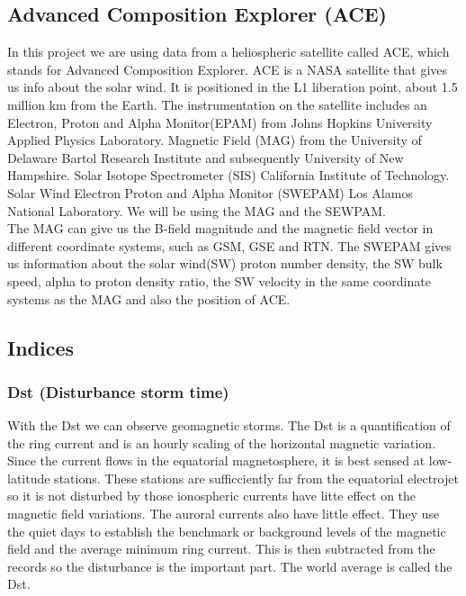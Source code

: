 \documentclass[norsk,a4paper,11pt]{article}
\begin{document}
\begin{multicols}{2}
\subsection{Advanced Composition Explorer (ACE)} %
\label{sub:ACE}
	In this project we are using data from a heliospheric satellite called ACE, which stands for Advanced Composition Explorer. ACE is a NASA satellite that gives us info about the solar wind. It is positioned in the L1 liberation point, about 1.5 million km from the Earth. The instrumentation on the satellite includes an Electron, Proton and Alpha Monitor(EPAM) from Johns Hopkins University Applied Physics Laboratory. Magnetic Field (MAG) from the University of Delaware Bartol Research Institute and subsequently University of New Hampshire. Solar Isotope Spectrometer (SIS) California Institute of Technology. Solar Wind Electron Proton and Alpha Monitor (SWEPAM) Los Alamos National Laboratory. We will be using the MAG and the SEWPAM. \\

	The MAG can give us the B-field magnitude and the magnetic field vector in different coordinate systems, such as GSM, GSE and RTN. The SWEPAM gives us information about the solar wind(SW) proton number density, the SW bulk speed, alpha to proton density ratio, the SW velocity in the same coordinate systems as the MAG and also the position of ACE.

\subsection{Indices} %
\label{sub:indices}

\subsubsection{Dst (Disturbance storm time)} %
\label{sub:Dst}
With the Dst we can observe geomagnetic storms. The Dst is a quantification of the ring current and is an hourly scaling of the horizontal magnetic variation. Since the current flows in the equatorial magnetosphere, it is best sensed at low-latitude stations. These stations are sufficciently far from the equatorial electrojet so it is not disturbed by those ionospheric currents have litte effect on the magnetic field variations. The auroral currents also have little effect. They use the quiet days to establish the benchmark or background levels of the magnetic field and the average minimum ring current. This is then subtracted from the records so the disturbance is the important part. The world average is called the Dst. 


\end{multicols}
\end{document}

